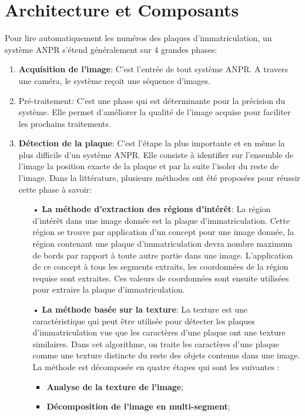 \section{Architecture et Composants}
Pour lire automatiquement les numéros des plaques d’immatriculation, un système ANPR s’étend généralement sur 4 grandes phases:
\begin{enumerate}
    \item \textbf{Acquisition de l’image}: C’est l’entrée de tout système ANPR. A travers une caméra, le système reçoit une séquence d’images.
    \item Pré-traitement: C’est une phase qui est déterminante pour la précision du système. Elle permet d’améliorer la qualité de l’image acquise pour faciliter les prochains traitements.
    \item \textbf{Détection de la plaque}: C’est l’étape la plus importante et en même la plus difficile d’un système ANPR. Elle consiste à identifier sur l’ensemble de l’image la position exacte de la plaque et par la suite l’isoler du reste de l’image. Dans la littérature, plusieurs méthodes ont été proposées pour réussir cette phase à savoir:
        \begin{itemize}
            \item[•] \textbf{La méthode d’extraction des régions d’intérêt}: La région d'intérêt dans une image donnée est la plaque d'immatriculation. Cette région se trouve par
            application d'un concept pour une image donnée, la région contenant une plaque d'immatriculation devra
            nombre maximum de bords par rapport à toute autre partie dans une image. L’application de ce concept à
            tous les segments extraits, les coordonnées de la région requise sont extraites. Ces valeurs de coordonnées
            sont ensuite utilisées pour extraire la plaque d'immatriculation.
            \item[•] \textbf{La méthode basée sur la texture}: La texture est une caractéristique qui peut être utilisée pour détecter les plaques d’immatriculation vue
            que les caractères d’une plaque ont une texture similaires. Dans cet algorithme, on traite les caractères
            d’une plaque comme une texture distincte du reste des objets contenus dans une image. La méthode est
            décomposée en quatre étapes qui sont les suivantes :
                \begin{itemize}
                    \item \textbf{Analyse de la texture de l’image};
                    \item \textbf{Décomposition de l’image en multi-segment};

\end{itemize}
\end{itemize}
\end{enumerate}
